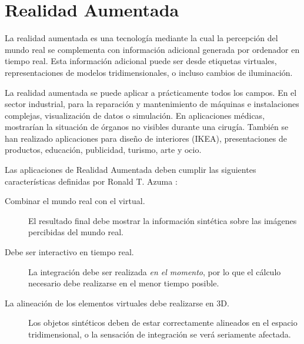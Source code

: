 \section{Realidad Aumentada}
La realidad aumentada es una tecnología mediante la cual la percepción del mundo real se complementa con información adicional generada por ordenador en tiempo real. Esta información adicional puede ser desde etiquetas virtuales, representaciones de modelos tridimensionales, o incluso cambios de iluminación. 


La realidad aumentada se puede aplicar a prácticamente todos los campos. En el sector industrial, para la reparación y mantenimiento de máquinas e instalaciones complejas, visualización de datos o simulación.  En aplicaciones médicas, mostrarían la situación de órganos no visibles durante una cirugía. También se han realizado aplicaciones para diseño de interiores (IKEA), presentaciones de productos, educación, publicidad, turismo, arte y ocio. 


Las aplicaciones de Realidad Aumentada deben cumplir las siguientes características definidas por Ronald T. Azuma \cite{Azuma}:

\begin{description}
\item[Combinar el mundo real con el virtual.] El resultado final debe mostrar la información sintética sobre las imágenes percibidas del mundo real.
\item[Debe ser interactivo en tiempo real.] La integración debe ser realizada \emph{en el momento}, por lo que el cálculo necesario debe realizarse en el menor tiempo posible.
\item[La alineación de los elementos virtuales debe realizarse en 3D.] Los objetos sintéticos deben de estar correctamente alineados en el espacio tridimensional,  o la sensación de integración se verá seriamente afectada.
\end{description}
 

